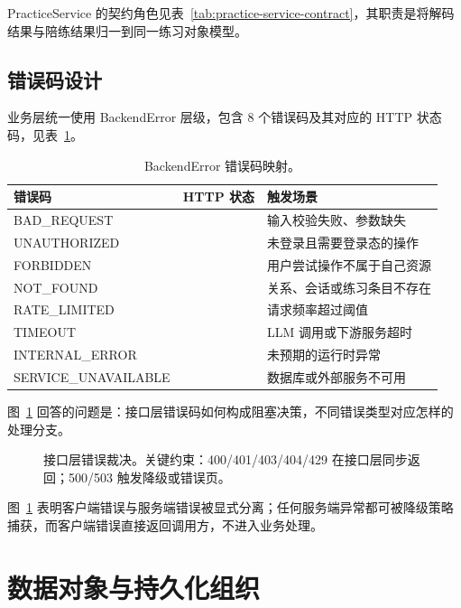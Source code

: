 PracticeService 的契约角色见表~\ref{tab:practice-service-contract}，其职责是将解码结果与陪练结果归一到同一练习对象模型。

\subsection{错误码设计}

业务层统一使用 BackendError 层级，包含 8 个错误码及其对应的 HTTP 状态码，见表~\ref{tab:backend-error-codes}。

\begin{table}[H]
  \centering
  \caption{BackendError 错误码映射。}
  \label{tab:backend-error-codes}
  \begin{tabularx}{\textwidth}{>{\raggedright\arraybackslash}p{3.5cm} >{\raggedright\arraybackslash}p{2cm} >{\raggedright\arraybackslash}X}
    \toprule
    错误码 & HTTP 状态 & 触发场景 \\
    \midrule
    BAD\_REQUEST & 400 & 输入校验失败、参数缺失 \\
    UNAUTHORIZED & 401 & 未登录且需要登录态的操作 \\
    FORBIDDEN & 403 & 用户尝试操作不属于自己资源 \\
    NOT\_FOUND & 404 & 关系、会话或练习条目不存在 \\
    RATE\_LIMITED & 429 & 请求频率超过阈值 \\
    TIMEOUT & 408 & LLM 调用或下游服务超时 \\
    INTERNAL\_ERROR & 500 & 未预期的运行时异常 \\
    SERVICE\_UNAVAILABLE & 503 & 数据库或外部服务不可用 \\
    \bottomrule
  \end{tabularx}
\end{table}

图~\ref{fig:pebble-error-gate} 回答的问题是：接口层错误码如何构成阻塞决策，不同错误类型对应怎样的处理分支。

\begin{figure}[H]
  \centering
  
  \caption{接口层错误裁决。关键约束：400/401/403/404/429 在接口层同步返回；500/503 触发降级或错误页。}
  \label{fig:pebble-error-gate}
\end{figure}

图~\ref{fig:pebble-error-gate} 表明客户端错误与服务端错误被显式分离；任何服务端异常都可被降级策略捕获，而客户端错误直接返回调用方，不进入业务处理。

\section{数据对象与持久化组织}

